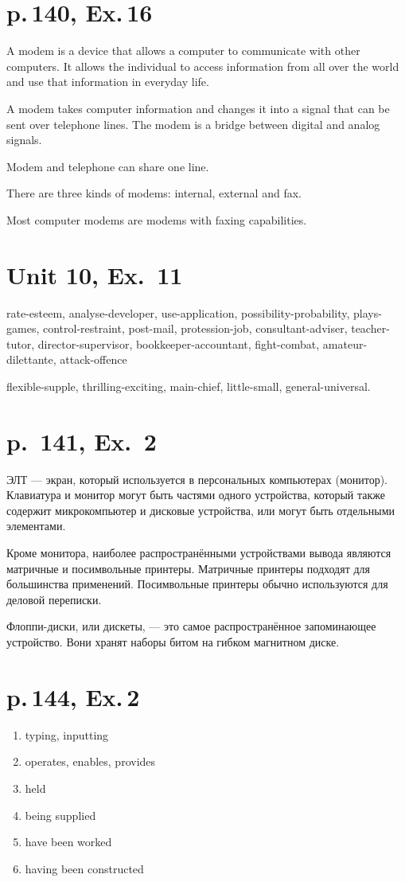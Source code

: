 \documentclass[a4paper,10pt,notitlepage,pdftex,headsepline]{scrartcl}
\begin{document}
\section{p.\,140, Ex.\,16}
A modem is a device that allows a computer to communicate with other computers.
It allows the individual to access information from all over the world and use that information in everyday life.

A modem takes computer information and changes it into a signal that can be sent over telephone lines.
The modem is a bridge between digital and analog signals.

Modem and telephone can share one line.

There are three kinds of modems: internal, external and fax.

Most computer modems are modems with faxing capabilities.
\section{Unit 10, Ex.\, 11}
rate-esteem, analyse-developer, use-application, possibility-probability, plays-games, control-restraint, post-mail, protession-job, consultant-adviser, teacher-tutor, director-supervisor, bookkeeper-accountant, fight-combat, amateur-dilettante, attack-offence

flexible-supple, thrilling-exciting, main-chief, little-small, general-universal.
\section{p.\, 141, Ex.\, 2}
ЭЛТ --- экран, который используется в персональных компьютерах (монитор).
Клавиатура и монитор могут быть частями одного устройства, который также содержит микрокомпьютер и дисковые устройства, или могут быть отдельными элементами.

Кроме монитора, наиболее распространёнными устройствами вывода являются матричные и посимвольные принтеры.
Матричные принтеры подходят для большинства применений.
Посимвольные принтеры обычно используются для деловой переписки.

Флоппи-диски, или дискеты, --- это самое распространённое запоминающее устройство.
Вони хранят наборы битом на гибком магнитном диске.
\section{p.\,144, Ex.\,2} 
\begin{enumerate}
\item typing, inputting
\item operates, enables, provides
\item held
\item being supplied
\item have been worked
\item having been constructed
\end{enumerate}
\end{document}

